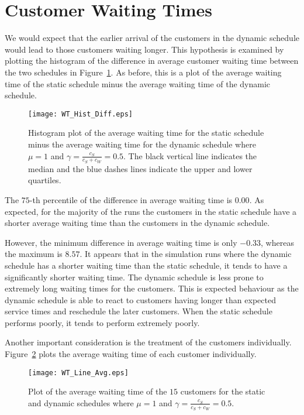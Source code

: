 \section{Customer Waiting Times}
We would expect that the earlier arrival of the customers in the dynamic schedule would lead to those customers waiting longer. This hypothesis is examined by plotting the histogram of the difference in average customer waiting time between the two schedules in Figure~\ref{fig:Diff_Wait}. As before, this is a plot of the average waiting time of the static schedule minus the average waiting time of the dynamic schedule.
\begin{figure}[htb]
	\centering
	\texttt{[image: WT\_Hist\_Diff.eps]}
	\caption{Histogram plot of the average waiting time for the static schedule minus the average waiting time for the dynamic schedule where $\mu = 1$ and $\gamma = \frac{c_{S}}{c_{S} + c_{W}} = 0.5$. The black vertical line indicates the median and the blue dashes lines indicate the upper and lower quartiles.}
	\label{fig:Diff_Wait}
\end{figure}

The $75$-th percentile of the difference in average waiting time is $0.00$. As expected, for the majority of the runs the customers in the static schedule have a shorter average waiting time than the customers in the dynamic schedule.

However, the minimum difference in average waiting time is only $-0.33$, whereas the maximum is $8.57$. It appears that in the simulation runs where the dynamic schedule has a shorter waiting time than the static schedule, it tends to have a significantly shorter waiting time. The dynamic schedule is less prone to extremely long waiting times for the customers. This is expected behaviour as the dynamic schedule is able to react to customers having longer than expected service times and reschedule the later customers. When the static schedule performs poorly, it tends to perform extremely poorly.

Another important consideration is the treatment of the customers individually. Figure~\ref{fig:Avg_Wait_Position} plots the average waiting time of each customer individually.
\begin{figure}[htb]
	\centering
	\texttt{[image: WT\_Line\_Avg.eps]}
	\caption{Plot of the average waiting time of the $15$ customers for the static and dynamic schedules where $\mu = 1$ and $\gamma = \frac{c_{S}}{c_{S} + c_{W}} = 0.5$.}
	\label{fig:Avg_Wait_Position}
\end{figure}

